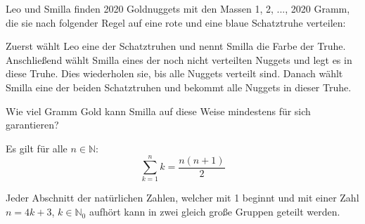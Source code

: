\documentclass[10pt, a4paper]{amsart}
\newenvironment{proof thm}[1]{
\begin{proof}[\proofname~(#1)]}{\end{proof}}
\begin{document}
\thispagestyle{fancy}
\begin{aufgabe}
  Leo und Smilla finden 2020 Goldnuggets mit den Massen 1, 2, ..., 2020 Gramm,
  die sie nach folgender Regel auf eine rote und eine blaue Schatztruhe
  verteilen:
  
  Zuerst wählt Leo eine der Schatztruhen und nennt Smilla die Farbe der Truhe.
  Anschließend wählt Smilla eines der noch nicht verteilten Nuggets und legt es
  in diese Truhe. Dies wiederholen sie, bis alle Nuggets verteilt sind. Danach
  wählt Smilla eine der beiden Schatztruhen und bekommt alle Nuggets in dieser
  Truhe.

  Wie viel Gramm Gold kann Smilla auf diese Weise mindestens für sich
  garantieren?
\end{aufgabe}
\begin{lemma}\label{sec1:Zahlensumme}
  Es gilt für alle $n\in\mathbb{N}$:
  \[ \sum^{n}_{k=1}k=\dfrac{n(n+1)}{2}\]
\end{lemma}
\begin{lemma}
  \label{sec1:zahlengruppen}
  Jeder Abschnitt der natürlichen Zahlen, welcher mit 1 beginnt und mit einer
  Zahl $n=4k+3$, $k∈ℕ_0$ aufhört kann in zwei gleich große Gruppen geteilt
  werden.
\end{lemma}
\end{document}
